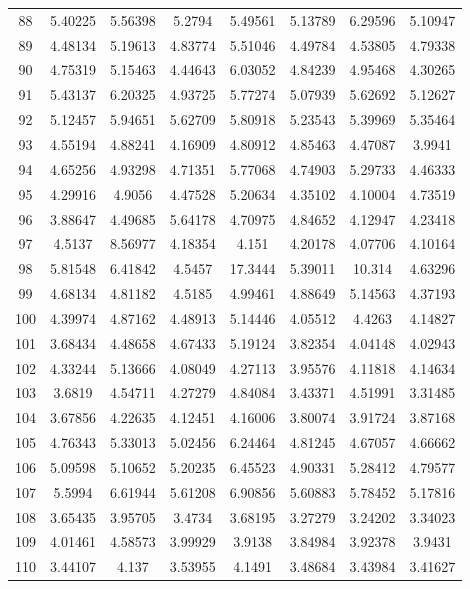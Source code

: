 \begin{center}
\begin{longtable}{cccccccc}
88 & 5.40225 & 5.56398 & 5.2794 & 5.49561 & 5.13789 & 6.29596 & 5.10947\\
89 & 4.48134 & 5.19613 & 4.83774 & 5.51046 & 4.49784 & 4.53805 & 4.79338\\
90 & 4.75319 & 5.15463 & 4.44643 & 6.03052 & 4.84239 & 4.95468 & 4.30265\\
91 & 5.43137 & 6.20325 & 4.93725 & 5.77274 & 5.07939 & 5.62692 & 5.12627\\
92 & 5.12457 & 5.94651 & 5.62709 & 5.80918 & 5.23543 & 5.39969 & 5.35464\\
93 & 4.55194 & 4.88241 & 4.16909 & 4.80912 & 4.85463 & 4.47087 & 3.9941\\
94 & 4.65256 & 4.93298 & 4.71351 & 5.77068 & 4.74903 & 5.29733 & 4.46333\\
95 & 4.29916 & 4.9056 & 4.47528 & 5.20634 & 4.35102 & 4.10004 & 4.73519\\
96 & 3.88647 & 4.49685 & 5.64178 & 4.70975 & 4.84652 & 4.12947 & 4.23418\\
97 & 4.5137 & 8.56977 & 4.18354 & 4.151 & 4.20178 & 4.07706 & 4.10164\\
98 & 5.81548 & 6.41842 & 4.5457 & 17.3444 & 5.39011 & 10.314 & 4.63296\\
99 & 4.68134 & 4.81182 & 4.5185 & 4.99461 & 4.88649 & 5.14563 & 4.37193\\
100 & 4.39974 & 4.87162 & 4.48913 & 5.14446 & 4.05512 & 4.4263 & 4.14827\\
101 & 3.68434 & 4.48658 & 4.67433 & 5.19124 & 3.82354 & 4.04148 & 4.02943\\
102 & 4.33244 & 5.13666 & 4.08049 & 4.27113 & 3.95576 & 4.11818 & 4.14634\\
103 & 3.6819 & 4.54711 & 4.27279 & 4.84084 & 3.43371 & 4.51991 & 3.31485\\
104 & 3.67856 & 4.22635 & 4.12451 & 4.16006 & 3.80074 & 3.91724 & 3.87168\\
105 & 4.76343 & 5.33013 & 5.02456 & 6.24464 & 4.81245 & 4.67057 & 4.66662\\
106 & 5.09598 & 5.10652 & 5.20235 & 6.45523 & 4.90331 & 5.28412 & 4.79577\\
107 & 5.5994 & 6.61944 & 5.61208 & 6.90856 & 5.60883 & 5.78452 & 5.17816\\
108 & 3.65435 & 3.95705 & 3.4734 & 3.68195 & 3.27279 & 3.24202 & 3.34023\\
109 & 4.01461 & 4.58573 & 3.99929 & 3.9138 & 3.84984 & 3.92378 & 3.9431\\
110 & 3.44107 & 4.137 & 3.53955 & 4.1491 & 3.48684 & 3.43984 & 3.41627\\

\end{longtable}
\end{center}
